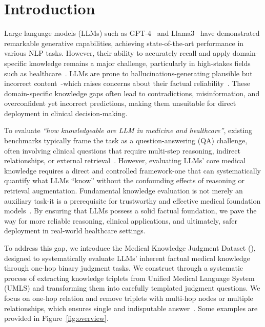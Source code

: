 \section{Introduction}
Large language models (LLMs) such as GPT-4~\cite{openai2023gpt4} and Llama3~\cite{dubey2024llama} have demonstrated remarkable generative capabilities, achieving state-of-the-art performance in various NLP tasks.
However, their ability to accurately recall and apply domain-specific knowledge remains a major challenge, particularly in high-stakes fields such as healthcare~\cite{li2022neural, bi2024decoding, yang2023large, liu2023evaluating, yan2023multimodal}. LLMs are prone to hallucinations-generating plausible but incorrect content~\cite{ji2023survey, bang2023multitask, zhang2023siren}-which raises concerns about their factual reliability~\cite{chen2023hallucination, li-etal-2024-dawn}. 
These domain-specific knowledge gaps often lead to contradictions, misinformation, and overconfident yet incorrect predictions, making them unsuitable for direct deployment in clinical decision-making. 



To evaluate \textit{``how knowledgeable are LLM in medicine and healthcare''}, existing benchmarks typically frame the task as a question-answering (QA) challenge, often involving clinical questions that require multi-step reasoning, indirect relationships, or external retrieval~\cite{pal2022medmcqa, malaviya-etal-2024-expertqa}. 
However, evaluating LLMs' core medical knowledge requires a direct and controlled framework-one that can systematically quantify what LLMs ``know'' without the confounding effects of reasoning or retrieval augmentation. 
Fundamental knowledge evaluation is not merely an auxiliary task-it is a prerequisite for trustworthy and effective medical foundation models~\cite{zhang2024generalist, moor2023foundation}. By ensuring that LLMs possess a solid factual foundation, we pave the way for more reliable reasoning, clinical applications, and ultimately, safer deployment in real-world healthcare settings.

To address this gap, we introduce the Medical Knowledge Judgment Dataset (\mkj), designed to systematically evaluate LLMs' inherent factual medical knowledge through one-hop binary judgment tasks. 
We construct \mkj through a systematic process of extracting knowledge triplets from Unified Medical Language System (UMLS) and transforming them into carefully templated judgment questions. 
We focus on one-hop relation and remove triplets with multi-hop nodes or multiple relationships, which ensures single and indisputable answer~\cite{weimeasuring, sun2024head}. Some examples are provided in Figure~\ref{fig:overview}.

